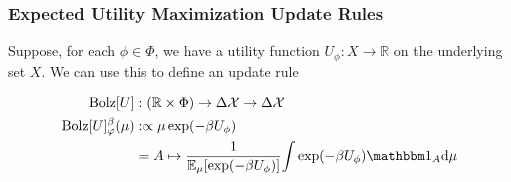 \documentclass{article}
\begin{document}
\subsubsection{Expected Utility Maximization Update Rules}


%
%

\def\Bolz#1{\mathrm{Bolz}[#1]}


Suppose, for each $\phi \in \Phi$, we have a utility function $U_\phi : X \to \mathbb R$ on the underlying set $X$.
We can use this to define an update rule

\begin{align*}
	\Bolz U &: (\mathbb R \times \Phi) \to \Delta\X \to \Delta\X \\
	\Bolz U^\beta_\varphi(\mu)
		&:\propto
			\mu \exp(-\beta U_\phi) \\
		&= A \mapsto \frac
			1{\Ex_{\mu} [ \exp(-\beta U_\phi)]}
			{\int \exp(-\beta U_\phi) \mathbbm 1_A \mathrm d\mu }
\end{align*}
\end{document}
